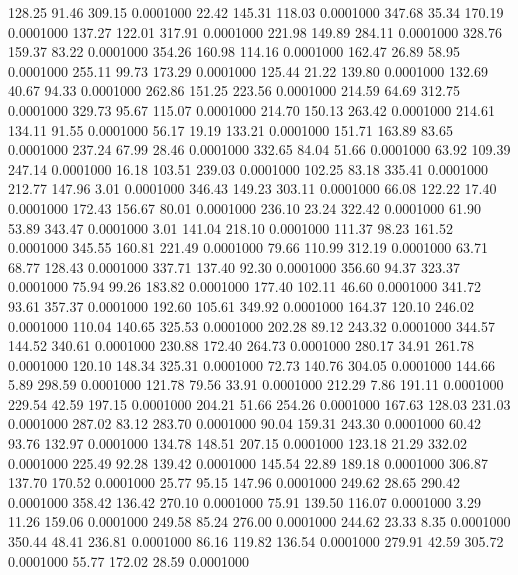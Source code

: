  128.25   91.46  309.15   0.0001000
  22.42  145.31  118.03   0.0001000
 347.68   35.34  170.19   0.0001000
 137.27  122.01  317.91   0.0001000
 221.98  149.89  284.11   0.0001000
 328.76  159.37   83.22   0.0001000
 354.26  160.98  114.16   0.0001000
 162.47   26.89   58.95   0.0001000
 255.11   99.73  173.29   0.0001000
 125.44   21.22  139.80   0.0001000
 132.69   40.67   94.33   0.0001000
 262.86  151.25  223.56   0.0001000
 214.59   64.69  312.75   0.0001000
 329.73   95.67  115.07   0.0001000
 214.70  150.13  263.42   0.0001000
 214.61  134.11   91.55   0.0001000
  56.17   19.19  133.21   0.0001000
 151.71  163.89   83.65   0.0001000
 237.24   67.99   28.46   0.0001000
 332.65   84.04   51.66   0.0001000
  63.92  109.39  247.14   0.0001000
  16.18  103.51  239.03   0.0001000
 102.25   83.18  335.41   0.0001000
 212.77  147.96    3.01   0.0001000
 346.43  149.23  303.11   0.0001000
  66.08  122.22   17.40   0.0001000
 172.43  156.67   80.01   0.0001000
 236.10   23.24  322.42   0.0001000
  61.90   53.89  343.47   0.0001000
   3.01  141.04  218.10   0.0001000
 111.37   98.23  161.52   0.0001000
 345.55  160.81  221.49   0.0001000
  79.66  110.99  312.19   0.0001000
  63.71   68.77  128.43   0.0001000
 337.71  137.40   92.30   0.0001000
 356.60   94.37  323.37   0.0001000
  75.94   99.26  183.82   0.0001000
 177.40  102.11   46.60   0.0001000
 341.72   93.61  357.37   0.0001000
 192.60  105.61  349.92   0.0001000
 164.37  120.10  246.02   0.0001000
 110.04  140.65  325.53   0.0001000
 202.28   89.12  243.32   0.0001000
 344.57  144.52  340.61   0.0001000
 230.88  172.40  264.73   0.0001000
 280.17   34.91  261.78   0.0001000
 120.10  148.34  325.31   0.0001000
  72.73  140.76  304.05   0.0001000
 144.66    5.89  298.59   0.0001000
 121.78   79.56   33.91   0.0001000
 212.29    7.86  191.11   0.0001000
 229.54   42.59  197.15   0.0001000
 204.21   51.66  254.26   0.0001000
 167.63  128.03  231.03   0.0001000
 287.02   83.12  283.70   0.0001000
  90.04  159.31  243.30   0.0001000
  60.42   93.76  132.97   0.0001000
 134.78  148.51  207.15   0.0001000
 123.18   21.29  332.02   0.0001000
 225.49   92.28  139.42   0.0001000
 145.54   22.89  189.18   0.0001000
 306.87  137.70  170.52   0.0001000
  25.77   95.15  147.96   0.0001000
 249.62   28.65  290.42   0.0001000
 358.42  136.42  270.10   0.0001000
  75.91  139.50  116.07   0.0001000
   3.29   11.26  159.06   0.0001000
 249.58   85.24  276.00   0.0001000
 244.62   23.33    8.35   0.0001000
 350.44   48.41  236.81   0.0001000
  86.16  119.82  136.54   0.0001000
 279.91   42.59  305.72   0.0001000
  55.77  172.02   28.59   0.0001000
